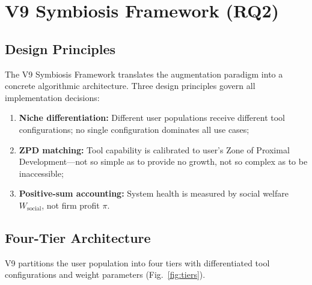 \documentclass[conference]{IEEEtran}
\begin{document}
\section{V9 Symbiosis Framework (RQ2)}
\label{sec:v9}

\subsection{Design Principles}

The V9 Symbiosis Framework translates the augmentation
paradigm into a concrete algorithmic architecture.
Three design principles govern all implementation
decisions:

\begin{enumerate}
  \item \textbf{Niche differentiation:} Different user
        populations receive different tool configurations;
        no single configuration dominates all use cases;
  \item \textbf{ZPD matching:} Tool capability is calibrated
        to user's Zone of Proximal Development---not so simple
        as to provide no growth, not so complex as to be
        inaccessible;
  \item \textbf{Positive-sum accounting:} System health
        is measured by social welfare $W_{\text{social}}$,
        not firm profit $\pi$.
\end{enumerate}

\subsection{Four-Tier Architecture}

V9 partitions the user population into four tiers with
differentiated tool configurations and weight parameters
(Fig.~\ref{fig:tiers}).
\end{document}
